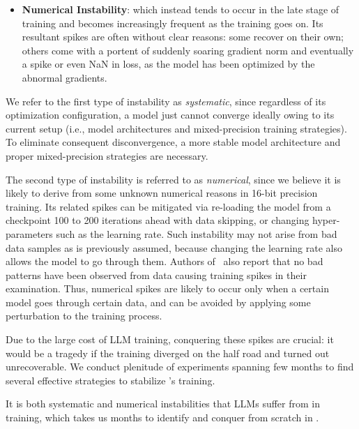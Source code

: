 {\begin{itemize}[leftmargin=*,itemsep=0pt,parsep=0.2em,topsep=0.0em,partopsep=0.0em]
\item \textbf{Numerical Instability}:
which instead tends to occur in the late stage of training and becomes increasingly frequent as the training goes on. 
Its resultant spikes are often without clear reasons: some recover on their own; others come with a portent of suddenly soaring gradient norm and eventually a spike or even NaN in loss, as the model has been optimized by the abnormal gradients. 
\end{itemize}

We refer to the first type of instability as \emph{systematic}, since regardless of its optimization configuration, a model just cannot converge ideally owing to its current setup (i.e., model architectures and mixed-precision training strategies). 
To eliminate consequent disconvergence, a more stable model architecture and proper mixed-precision strategies are necessary.

The second type of instability is referred to as \emph{numerical}, since we believe it is likely to derive from some unknown numerical reasons in 16-bit precision training.
Its related spikes can be mitigated via re-loading the model from a checkpoint 100 to 200 iterations ahead with data skipping, or changing hyper-parameters such as the learning rate.
Such instability may not arise from bad data samples as is previously assumed, because changing the learning rate also allows the model to go through them.
Authors of~\citep{chowdhery2022palm} also report that no bad patterns have been observed from data causing training spikes in their examination.
Thus, numerical spikes are likely to occur only when a certain model goes through certain data, and can be avoided by applying some perturbation to the training process.

Due to the large cost of LLM training, conquering these spikes are crucial: it would be a tragedy if the training diverged on the half road and turned out unrecoverable. 
We conduct plenitude of experiments spanning few months to find several effective strategies to stabilize \glm's training.

\begin{insight}
\rm It is both systematic and numerical instabilities that LLMs suffer from in training, which takes us months to identify and conquer from scratch in \glm.
\end{insight}

}
